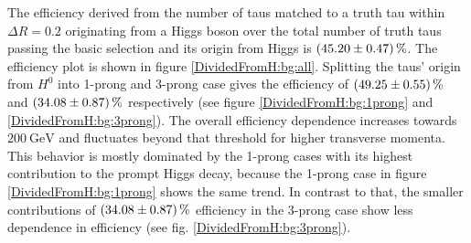 %
%
The efficiency derived from the number of taus matched to a truth tau within $\Delta R=0.2$ originating from a Higgs boson over the total number of truth taus passing the basic selection and its origin from Higgs is $\SI{45.20\pm 0.47}{\percent}$. The efficiency plot is shown in figure \ref{DividedFromH:bg:all}. Splitting the taus' origin from $H^0$ into 1-prong and 3-prong case gives the efficiency of $\SI{49.25\pm 0.55}{\percent}$ and $\SI{34.08\pm 0.87}{\percent}$ respectively (see figure \ref{DividedFromH:bg:1prong} and \ref{DividedFromH:bg:3prong}). %
The overall efficiency dependence increases towards $\SI{200}{\giga\electronvolt}$ and fluctuates beyond that threshold for higher transverse momenta. This behavior is mostly dominated by the 1-prong cases with its highest contribution to the prompt Higgs decay, because the 1-prong case in figure \ref{DividedFromH:bg:1prong} shows the same trend. In contrast to that, the smaller contributions of $\SI{34.08\pm 0.87}{\percent}$ efficiency in the 3-prong case show less dependence in efficiency (see fig. \ref{DividedFromH:bg:3prong}).\par 
%

